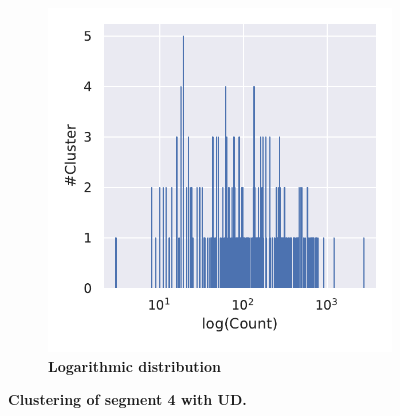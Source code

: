 \begin{figure}[!htb]
\begin{subfigure}[b]{0.475\textwidth}
    \end{subfigure}
    \hfill
    \begin{subfigure}[b]{0.475\textwidth}
        \caption[Logarithmic distribution]{\textbf{Logarithmic distribution}}
        \label{subfig:UMAP_Cluster_DBCV_Distribution_log_4}            \includegraphics[width=\textwidth]{UMAP/Cluster_Distribution_Log_Segment_4_alternative.pdf}
    \end{subfigure}
    \caption[Clustering of segment 4 with UD]{\textbf{Clustering of segment 4 with UD.} }
    \label{fig:UMAP_Cluster_DBCV_4}
\end{figure}

\FloatBarrier
\newpage

